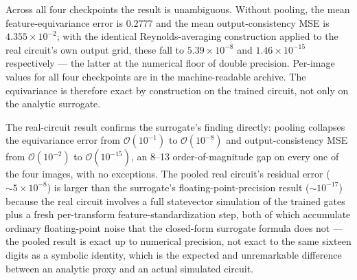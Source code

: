 \documentclass[11pt]{article}
\begin{document}
Across all four checkpoints the result is unambiguous. Without pooling, the mean feature-equivariance error is $0.2777$ and the mean output-consistency MSE is $4.355\times10^{-2}$; with the identical Reynolds-averaging construction applied to the real circuit's own output grid, these fall to $5.39\times10^{-8}$ and $1.46\times10^{-15}$ respectively --- the latter at the numerical floor of double precision. Per-image values for all four checkpoints are in the machine-readable archive. The equivariance is therefore exact by construction on the trained circuit, not only on the analytic surrogate.

The real-circuit result confirms the surrogate's finding directly: pooling collapses the equivariance error from $\mathcal{O}(10^{-1})$ to $\mathcal{O}(10^{-8})$ and output-consistency MSE from $\mathcal{O}(10^{-2})$ to $\mathcal{O}(10^{-15})$, an 8--13 order-of-magnitude gap on every one of the four images, with no exceptions. The pooled real circuit's residual error ($\sim\!5\times10^{-8}$) is larger than the surrogate's floating-point-precision result ($\sim\!10^{-17}$) because the real circuit involves a full statevector simulation of the trained gates plus a fresh per-transform feature-standardization step, both of which accumulate ordinary floating-point noise that the closed-form surrogate formula does not --- the pooled result is exact up to numerical precision, not exact to the same sixteen digits as a symbolic identity, which is the expected and unremarkable difference between an analytic proxy and an actual simulated circuit.
\end{document}
